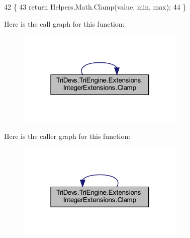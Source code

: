 \begin{DoxyCode}
42         \{
43             \textcolor{keywordflow}{return} Helpers.Math.Clamp(value, min, max);
44         \}
\end{DoxyCode}


Here is the call graph for this function\-:
\nopagebreak
\begin{figure}[H]
\begin{center}
\leavevmode
\includegraphics[width=226pt]{class_tri_devs_1_1_tri_engine_1_1_extensions_1_1_integer_extensions_a89001f67bea2770c4a13660411a55af9_cgraph}
\end{center}
\end{figure}




Here is the caller graph for this function\-:
\nopagebreak
\begin{figure}[H]
\begin{center}
\leavevmode
\includegraphics[width=226pt]{class_tri_devs_1_1_tri_engine_1_1_extensions_1_1_integer_extensions_a89001f67bea2770c4a13660411a55af9_icgraph}
\end{center}
\end{figure}


